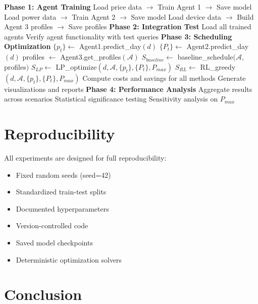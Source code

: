 \documentclass[conference]{IEEEtran}
\begin{document}
\begin{algorithm}
\caption{Multi-Agent System Execution}
\begin{algorithmic}[1]
\STATE \textbf{Phase 1: Agent Training}
\STATE Load price data $\rightarrow$ Train Agent 1 $\rightarrow$ Save model
\STATE Load power data $\rightarrow$ Train Agent 2 $\rightarrow$ Save model
\STATE Load device data $\rightarrow$ Build Agent 3 profiles $\rightarrow$ Save profiles
\STATE
\STATE \textbf{Phase 2: Integration Test}
\STATE Load all trained agents
\STATE Verify agent functionality with test queries
\STATE
\STATE \textbf{Phase 3: Scheduling Optimization}
    \STATE $\{p_t\} \gets$ Agent1.predict\_day$(d)$
    \STATE $\{P_t\} \gets$ Agent2.predict\_day$(d)$
    \STATE profiles $\gets$ Agent3.get\_profiles$(\mathcal{A})$
    \STATE $S_{baseline} \gets$ baseline\_schedule$(\mathcal{A},$profiles$)$
    \STATE $S_{LP} \gets$ LP\_optimize$(d, \mathcal{A}, \{p_t\}, \{P_t\}, P_{max})$
    \STATE $S_{RL} \gets$ RL\_greedy$(d, \mathcal{A}, \{p_t\}, \{P_t\}, P_{max})$
    \STATE Compute costs and savings for all methods
    \STATE Generate visualizations and reports
\ENDFOR
\STATE
\STATE \textbf{Phase 4: Performance Analysis}
\STATE Aggregate results across scenarios
\STATE Statistical significance testing
\STATE Sensitivity analysis on $P_{max}$
\end{algorithmic}
\end{algorithm}

\section{Reproducibility}

All experiments are designed for full reproducibility:
\begin{itemize}
    \item Fixed random seeds (seed=42)
    \item Standardized train-test splits
    \item Documented hyperparameters
    \item Version-controlled code
    \item Saved model checkpoints
    \item Deterministic optimization solvers
\end{itemize}

\section{Conclusion}
\end{document}
